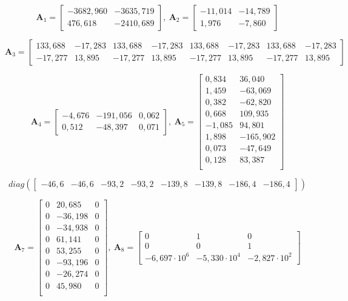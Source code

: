 \[
\boldsymbol{A}_{1} = 
\begin{bmatrix}
-3682,960 & -3635,719 \\
476,618 & -2410,689
\end{bmatrix}, \ 
\boldsymbol{A}_{2} = 
\begin{bmatrix}
-11,014 & -14,789 \\
1,976 & -7,860
\end{bmatrix}
\]

\[
\boldsymbol{A}_{3} = 
\begin{bmatrix}
    133,688 & -17,283 & 133,688 & -17,283 & 133,688 & -17,283 & 133,688 & -17,283 \\
    -17,277 & 13,895 & -17,277 & 13,895 & -17,277 & 13,895 & -17,277 & 13,895
\end{bmatrix}
\]

\[
\boldsymbol{A}_{4} = 
\begin{bmatrix}
    -4,676 & -191,056 & 0,062 \\
    0,512 & -48,397 & 0,071
\end{bmatrix}, \
\boldsymbol{A}_{5} = 
\begin{bmatrix} 
    0,834 & 36,040      \\
    1,459 & -63,069     \\
    0,382 & -62,820     \\
    0,668 & 109,935     \\
    -1,085 & 94,801     \\
    1,898 & -165,902    \\
    0,073 & -47,649     \\
    0,128 & 83,387      \\
\end{bmatrix}
\]

\[
diag\left( \begin{bmatrix} -46,6 & -46,6 & -93,2 & -93,2 & -139,8 & -139,8 & -186,4 & -186,4 \end{bmatrix} \right)
\]

\[
\boldsymbol{A}_{7} = 
\begin{bmatrix}
    0 & 20,685  &  0 \\
    0 & -36,198 &  0 \\
    0 & -34,938 &  0 \\
    0 & 61,141  &  0 \\
    0 & 53,255  &  0 \\
    0 & -93,196 &  0 \\
    0 & -26,274 &  0 \\
    0 & 45,980  &  0 \\
\end{bmatrix}, \ 
\boldsymbol{A}_{8} = 
\begin{bmatrix}
    0 & 1 & 0 \\
    0 & 0 & 1 \\
    -6,697\cdot10^{6} & -5,330\cdot10^{4} & -2,827\cdot10^{2}
\end{bmatrix}
\]

